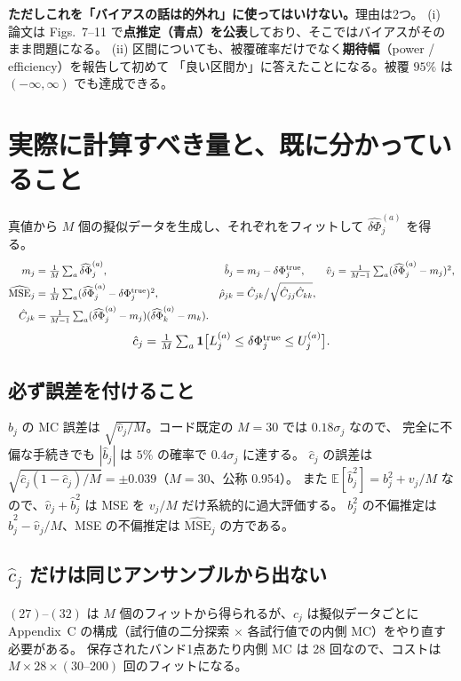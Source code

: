 \documentclass[11pt,a4paper]{ltjsarticle}
\newcommand{\dP}{\delta\Phi}
\newcommand{\dPh}{\widehat{\delta\Phi}}
\newcommand{\E}{\mathbb{E}}
\begin{document}
\textbf{ただしこれを「バイアスの話は的外れ」に使ってはいけない。}理由は2つ。
(i) 論文は Figs.~7--11 で\textbf{点推定（青点）を公表}しており、そこではバイアスがそのまま問題になる。
(ii) 区間についても、被覆確率だけでなく\textbf{期待幅}（power / efficiency）を報告して初めて
「良い区間か」に答えたことになる。被覆 $95\%$ は $(-\infty,\infty)$ でも達成できる。

\section{実際に計算すべき量と、既に分かっていること}

真値から $M$ 個の擬似データを生成し、それぞれをフィットして $\dPh^{(a)}_j$ を得る。
\begin{align}
m_j&=\tfrac1M\textstyle\sum_a \dPh_j^{(a)},&
\hat b_j&=m_j-\dP_j^{\rm true},&
\hat v_j&=\tfrac{1}{M-1}\textstyle\sum_a(\dPh_j^{(a)}-m_j)^2,\\
\widehat{\mathrm{MSE}}_j&=\tfrac1M\textstyle\sum_a(\dPh_j^{(a)}-\dP_j^{\rm true})^2,&
\hat\rho_{jk}&=\hat C_{jk}\big/\sqrt{\hat C_{jj}\hat C_{kk}},\\
\hat C_{jk}&=\tfrac{1}{M-1}\textstyle\sum_a(\dPh_j^{(a)}-m_j)(\dPh_k^{(a)}-m_k). &&
\end{align}
\begin{equation}
\hat c_j=\tfrac1M\textstyle\sum_a \mathbf{1}\big[L_j^{(a)}\le \dP_j^{\rm true}\le U_j^{(a)}\big].
\end{equation}

\subsection*{必ず誤差を付けること}
$\hat b_j$ の MC 誤差は $\sqrt{\hat v_j/M}$。コード既定の $M=30$ では $0.18\sigma_j$ なので、
完全に不偏な手続きでも $|\hat b_j|$ は $5\%$ の確率で $0.4\sigma_j$ に達する。
$\hat c_j$ の誤差は $\sqrt{\hat c_j(1-\hat c_j)/M}=\pm0.039$（$M=30$、公称 0.954）。
また $\E[\hat b_j^2]=b_j^2+v_j/M$ なので、$\hat v_j+\hat b_j^2$ は MSE を $v_j/M$ だけ系統的に過大評価する。
$b_j^2$ の不偏推定は $\hat b_j^2-\hat v_j/M$、MSE の不偏推定は $\widehat{\mathrm{MSE}}_j$ の方である。

\subsection*{$\hat c_j$ だけは同じアンサンブルから出ない}
$(27)$--$(32)$ は $M$ 個のフィットから得られるが、$\hat c_j$ は擬似データごとに
Appendix~C の構成（試行値の二分探索 × 各試行値での内側 MC）をやり直す必要がある。
保存されたバンド1点あたり内側 MC は 28 回なので、コストは $M\times28\times(30\text{--}200)$ 回のフィットになる。
\end{document}
